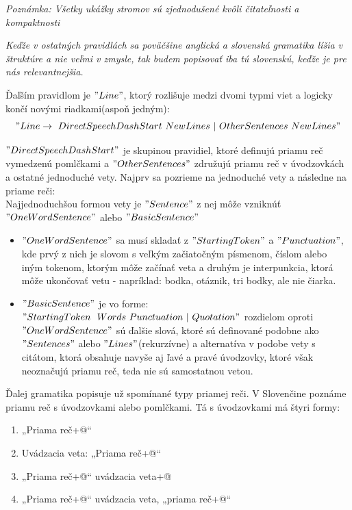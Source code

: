 \documentclass[12pt,a4paper]{report}
\theoremstyle{definition}
\theoremstyle{remark}
\begin{document}
\textit{Poznámka: Všetky ukážky stromov sú zjednodušené kvôli čitateľnosti a kompaktnosti}

\textit{Keďže v ostatných pravidlách sa poväčšine anglická a slovenská gramatika líšia v štruktúre a nie veľmi v zmysle, tak budem popisovať iba tú slovenskú, keďže je pre nás relevantnejšia.} 


Ďaľším pravidlom je $"Line"$, ktorý rozlišuje medzi dvomi typmi viet a logicky končí novými riadkami(aspoň jedným):
$$"Line \to \ DirectSpeechDashStart \ NewLines \ | \ OtherSentences \ NewLines "$$

\noindent $"DirectSpeechDashStart"$ je skupinou pravidiel, ktoré definujú priamu reč vymedzenú pomlčkami a $"OtherSentences"$ združujú priamu reč v úvodzovkách a ostatné jednoduché vety. Najprv sa pozrieme na jednoduché vety a následne na priame reči: \\


\noindent Najjednoduchšou formou vety je $"Sentence"$ z nej môže vzniknúť \\ $"OneWordSentence"$ alebo $"BasicSentence"$
\begin{itemize}
\item $"OneWordSentence"$ sa musí skladať z $"StartingToken"$ a $"Punctuation"$, kde prvý z nich je slovom s veľkým začiatočným písmenom, číslom alebo iným tokenom, ktorým môže začínať veta a druhým je interpunkcia, ktorá môže ukončovať vetu - napríklad: bodka, otáznik, tri bodky, ale nie čiarka.
\item $"BasicSentence"$ je vo forme: $"StartingToken \ \ Words \ Punctuation \ | \ Quotation"$
	rozdielom oproti $"OneWordSentence"$ sú ďalšie slová, ktoré sú definované podobne ako $"Sentences"$ alebo $"Lines"$(rekurzívne) a alternatíva v podobe vety s citátom, ktorá obsahuje navyše aj ľavé a pravé úvodzovky, ktoré však neoznačujú priamu reč, teda nie sú samostatnou vetou.
\end{itemize}

Ďalej gramatika popisuje už spomínané typy priamej reči. V Slovenčine poznáme priamu reč s úvodzovkami  alebo pomlčkami. Tá s úvodzovkami má štyri formy:
\begin{enumerate}[leftmargin=*]
\item „Priama reč\verb@[.?!]+@“
\item Uvádzacia veta: „Priama reč\verb@[.?!]+@“
\item „Priama reč\verb@[,?!]+@“ uvádzacia veta\verb@[.?!]+@
\item „Priama reč\verb@[,?!]+@“ uvádzacia veta, „priama reč\verb@[.?!]+@“
\end{enumerate}
\end{document}
